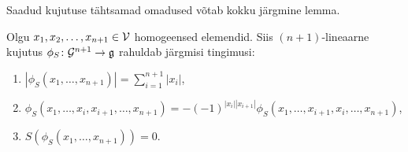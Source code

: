 Saadud kujutuse tähtsamad omadused võtab kokku järgmine lemma.

\begin{lemma}\label{lemma:indutseeritud-sulu-omadused}
    Olgu $x_1, x_2, \dots, x_{n+1} \in \mathcal{V}$ homogeensed elemendid.
    Siis $(n+1)$-lineaarne kujutus $\phi_S \colon \mathcal{G}^{n+1} \to \mathfrak{g}$
    rahuldab järgmisi tingimusi:
    \begin{enumerate}[label=\arabic*)]
        \item $ |\phi_S \left(x_1, \dots, x_{n+1} \right)| =
                \sum_{i=1}^{n+1} |x_i|$,
        \item $ \phi_S \left(x_1, \dots, x_i, x_{i+1}, \dots, x_{n+1} \right) =
               -(-1)^{|x_i| |x_{i+1}|} \phi_S \left(
                    x_1, \dots, x_{i+1}, x_i, \dots, x_{n+1}
                \right) $,
        \item $S \left( \phi_S \left( x_1, \dots, x_{n+1} \right) \right) = 0$.
    \end{enumerate}
\end{lemma}

